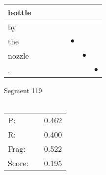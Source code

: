 \documentclass[landscape]{article}
\newcommand{\ssp}{\hspace{2pt}}
\newcommand{\mex}{\cellcolor{g}$\bullet$}
\begin{document}
\begin{tabular}{|l|p{10pt}|p{10pt}|p{10pt}|p{10pt}|p{10pt}|p{10pt}|p{10pt}|}
\hline
\ssp bottle \ssp&\hspace{2pt}&\hspace{2pt}&\hspace{2pt}&\hspace{2pt}&\hspace{2pt}&\hspace{2pt}&\hspace{2pt}\\
\hline
\ssp by \ssp&\hspace{2pt}&\hspace{2pt}&\hspace{2pt}&\hspace{2pt}&\hspace{2pt}&\hspace{2pt}&\hspace{2pt}\\
\hline
\ssp \cellcolor{ref4}the \ssp&\hspace{2pt}&\hspace{2pt}&\hspace{2pt}&\hspace{2pt}&\hspace{2pt}\mex&\hspace{2pt}&\hspace{2pt}\\
\hline
\ssp \cellcolor{ref5}nozzle \ssp&\hspace{2pt}&\hspace{2pt}&\hspace{2pt}&\hspace{2pt}&\hspace{2pt}&\hspace{2pt}\mex&\hspace{2pt}\\
\hline
\ssp \cellcolor{ref6}. \ssp&\hspace{2pt}&\hspace{2pt}&\hspace{2pt}&\hspace{2pt}&\hspace{2pt}&\hspace{2pt}&\hspace{2pt}\mex\\
\hline
\end{tabular}

\vspace{6pt}
\noindent Segment 119\\\\
\noindent\begin{tabular}{lm{12pt}r}
\hline
P:&&0.462\\
R:&&0.400\\
Frag:&&0.522\\
Score:&&0.195\\
\end{tabular}
\end{document}
